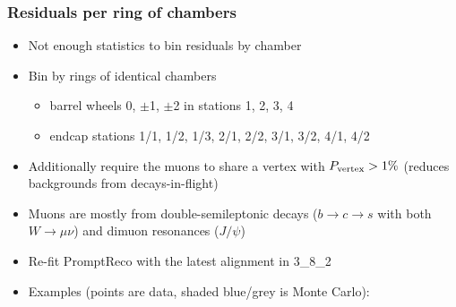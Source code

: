 \documentclass[compress]{beamer}
\newcommand{\s}[1]{{\mbox{\scriptsize #1}}}
\begin{document}
\begin{frame}
\frametitle{Residuals per ring of chambers}
\begin{itemize}
\item Not enough statistics to bin residuals by chamber

\item Bin by rings of identical chambers
\begin{itemize}
\item barrel wheels 0, $\pm$1, $\pm$2 in stations 1, 2, 3, 4
\item endcap stations 1/1, 1/2, 1/3, 2/1, 2/2, 3/1, 3/2, 4/1, 4/2
\end{itemize}

\item Additionally require the muons to share a vertex with
  $P_\s{vertex} > 1\%$ (reduces backgrounds from decays-in-flight)

\item Muons are mostly from double-semileptonic decays ($b \to c \to
  s$ with both $W \to \mu\nu$) and dimuon resonances ($J/\psi$)

\item Re-fit PromptReco with the latest alignment in 3\_8\_2

\item Examples (points are data, shaded blue/grey is Monte Carlo):
\end{itemize}


\end{frame}
\end{document}

